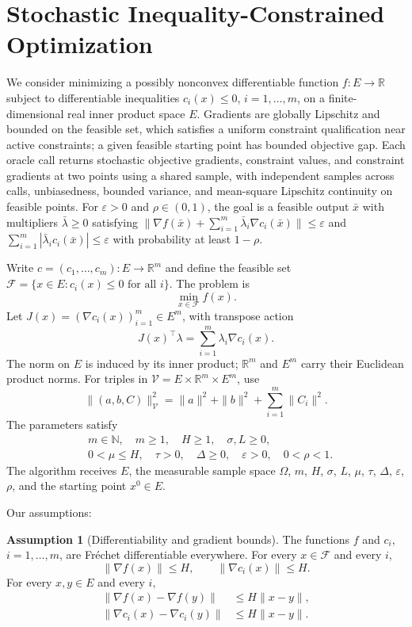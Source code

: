 \documentclass[10pt]{article}
\theoremstyle{definition}
\newtheorem{assumption}{Assumption}
\begin{document}
\section*{Stochastic Inequality-Constrained Optimization}
We consider minimizing a possibly nonconvex differentiable function $f:E\to\mathbb{R}$ subject to differentiable inequalities $c_i(x)\leq0$, $i=1,\ldots,m$, on a finite-dimensional real inner product space $E$. Gradients are globally Lipschitz and bounded on the feasible set, which satisfies a uniform constraint qualification near active constraints; a given feasible starting point has bounded objective gap. Each oracle call returns stochastic objective gradients, constraint values, and constraint gradients at two points using a shared sample, with independent samples across calls, unbiasedness, bounded variance, and mean-square Lipschitz continuity on feasible points. For $\varepsilon>0$ and $\rho\in(0,1)$, the goal is a feasible output $\bar{x}$ with multipliers $\bar{\lambda}\geq0$ satisfying $\|\nabla f(\bar{x})+\sum_{i=1}^m\bar{\lambda}_i\nabla c_i(\bar{x})\|\leq\varepsilon$ and $\sum_{i=1}^m|\bar{\lambda}_ic_i(\bar{x})|\leq\varepsilon$ with probability at least $1-\rho$.

Write $c=(c_1,\ldots,c_m):E\to\mathbb{R}^m$ and define the feasible set $\mathcal F=\{x\in E:c_i(x)\leq0\text{ for all }i\}$. The problem is
\[
\min_{x\in\mathcal F} f(x).
\]
Let $J(x)=(\nabla c_i(x))_{i=1}^m\in E^m$, with transpose action
\[
J(x)^\top\lambda=\sum_{i=1}^m\lambda_i\nabla c_i(x).
\]
The norm on $E$ is induced by its inner product; $\mathbb{R}^m$ and $E^m$ carry their Euclidean product norms. For triples in $\mathcal V=E\times\mathbb{R}^m\times E^m$, use
\[
\|(a,b,C)\|_{\mathcal V}^2
=\|a\|^2+\|b\|^2+\sum_{i=1}^m\|C_i\|^2.
\]
The parameters satisfy
\[
\begin{aligned}
&m\in\mathbb{N},\quad m\geq1,\quad H\geq1,\quad \sigma,L\geq0,\\
&0<\mu\leq H,\quad \tau>0,\quad \Delta\geq0,\quad
\varepsilon>0,\quad 0<\rho<1.
\end{aligned}
\]
The algorithm receives $E$, the measurable sample space $\Omega$, $m$, $H$, $\sigma$, $L$, $\mu$, $\tau$, $\Delta$, $\varepsilon$, $\rho$, and the starting point $x^0\in E$.

Our assumptions:
\begin{assumption}[Differentiability and gradient bounds]
The functions $f$ and $c_i$, $i=1,\ldots,m$, are Fr\'echet differentiable everywhere. For every $x\in\mathcal F$ and every $i$,
\[
\|\nabla f(x)\|\leq H,
\qquad \|\nabla c_i(x)\|\leq H.
\]
For every $x,y\in E$ and every $i$,
\[
\begin{aligned}
\|\nabla f(x)-\nabla f(y)\|&\leq H\|x-y\|,\\
\|\nabla c_i(x)-\nabla c_i(y)\|&\leq H\|x-y\|.
\end{aligned}
\]
\end{assumption}
\end{document}
